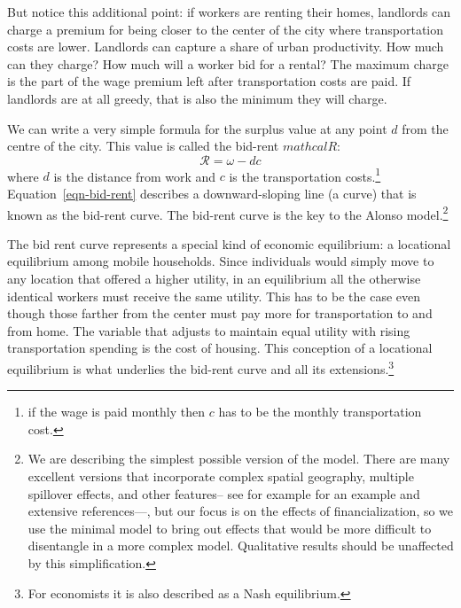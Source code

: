 But notice this additional point: if workers are renting their homes, landlords can charge a premium for being closer to the center of the city where transportation costs are lower.  Landlords can capture a share of urban productivity. How much can they charge? How much will a worker bid for a rental? The maximum charge is the part of the wage premium left after transportation costs are paid. If landlords are at all greedy, that is also the minimum they will charge. 

We can write a very simple formula for the surplus  value at any point $d$ from the centre of the city. This value is called the bid-rent  $mathcal{R}$: 
\begin{equation}  
\mathcal{R}= \omega - dc \label{eqn-bid-rent}\end{equation}
where $d$ is the distance from work and $c$ is the transportation costs.\footnote{ if the wage is paid monthly then $c$ has to be the monthly transportation cost.} Equation~\ref{eqn-bid-rent} describes a downward-sloping line (a curve) that is known as the bid-rent curve. The bid-rent curve is the key to the Alonso model.\footnote{We are describing the simplest possible version of the model. There are many excellent versions that incorporate complex spatial geography, multiple spillover effects, and other features-- see for example \cite{ahlfeldtECONOMICSDENSITYEVIDENCE2015} for an example and extensive references---, but our focus is on the effects of financialization, so we use the minimal model to bring out effects that would be more difficult to disentangle in a more complex model. Qualitative results should be unaffected by this simplification.}   

The bid rent curve represents a special  kind of economic equilibrium:   a locational equilibrium among mobile households. Since individuals would simply move to any location that offered a higher utility, in an equilibrium all the otherwise identical workers must receive the same utility. This has to be the case even though those farther from the center must pay more for transportation to and from home. The variable that  adjusts to maintain equal utility with rising transportation spending is the cost of housing. This conception of a \gls{locational equilibrium} is what underlies the bid-rent curve and all its extensions.\footnote{For economists it is also described as a Nash equilibrium.}


